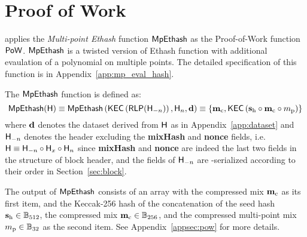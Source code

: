 
\section{Proof of Work}
\label{sec:pow}





{\name} applies the \emph{Multi-point Ethash} function $\mathsf{MpEthash}$
as the Proof-of-Work function $\mathsf{PoW}$.
$\mathsf{MpEthash}$ is a twisted version of \textsf{Ethash} function with additional evaulation of a polynomial on multiple points.
The detailed specification of this function is in Appendix~\ref{app:mp_eval_hash}.

The $\mathsf{MpEthash}$ function is defined as:
\begin{equation}\label{eq:mpethash}
	\mathsf{MpEthash}(\textsf{H})
	\equiv \mathsf{MpEthash}\left(\mathsf{KEC}\left(\mathsf{RLP}( \textsf{H}_{-n} )\right), \textsf{H}_{n},\mathbf{d}\right) 
	\equiv 
	{\left \{{\ensuremath{\mathbf{m}_{\mathrm{c}}}, \ensuremath{\mathsf{KEC}}\left(\ensuremath{\mathbf{s}_{\mathrm{h}}}\circ \ensuremath{\mathbf{m}_{\mathrm{c}}}\circ \ensuremath{{m}_{\mathrm{p}}}\right)} \right \}}
\end{equation}
where $\mathbf{d}$ denotes the dataset derived from $\textsf{H}$ as in Appendix~\ref{app:dataset} and $\textsf{H}_{-n}$ denotes the header excluding the {\bf mixHash} and {\bf nonce} fields,
i.e. $\textsf{H} \equiv \textsf{H}_{-n} \circ \textsf{H}_x \circ \textsf{H}_n$ since {\bf mixHash} and {\bf nonce} are indeed the last two fields in the structure of block header,
and the fields of $\textsf{H}_{-n}$ are \rlp-serialized according to their order in Section~\ref{sec:block}. 

The output of $\mathsf{MpEthash}$ consists of an array with the compressed mix $\mathbf{m}_{\mathrm{c}}$ as its first item, 
and the Keccak-256 hash of the concatenation of the seed hash $\mathbf{s}_{\mathrm{h}}\in \mathbb{B}_{512}$, the compressed mix $\mathbf{m}_{\mathrm{c}}\in \mathbb{B}_{256}$,
and the compressed multi-point mix ${m}_{\mathrm{p}}\in\mathbb{B}_{32}$ as the second item.
See Appendix~\ref{appsec:pow} for more details.

